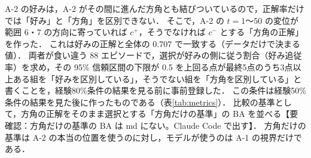 A-2 の好みは，A-2 がその間に進んだ方角とも結びついているので，正解率だけでは「好み」と「方角」を区別できない．
そこで，A-2 の $t=1$〜50 の変位が範囲 6・7 の方向に寄っていれば $c^{+}$，そうでなければ $c^{-}$ とする「方角の正解」を作った．
これは好みの正解と全体の 0.707 で一致する（データだけで決まる値）．
両者が食い違う 88 エピソードで，選択が好みの側に従う割合（好み追従率）を求め，その 95\% 信頼区間の下限が 0.5 を上回る点が最終5点のうち3点以上ある組を「好みを区別している」，そうでない組を「方角を区別している」と書くことを，経験80\%条件の結果を見る前に事前登録した．
この条件は経験50\%条件の結果を見た後に作ったものである（表\ref{tab:metrics}）．
比較の基準として，方角の正解をそのまま選択とする「方角だけの基準」の BA を並べる【要確認：方角だけの基準の BA は md にない。Claude Code で出す】．
方角だけの基準は A-2 の本当の位置を使うのに対し，モデルが使うのは A-1 の視界だけである．
